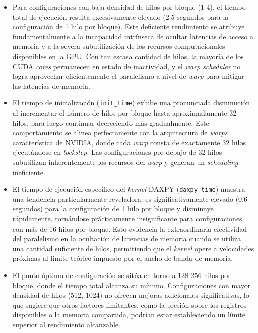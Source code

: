         \begin{itemize}
        
            \item Para configuraciones con baja densidad de hilos por bloque (1-4), el tiempo total de ejecución resulta excesivamente elevado (2.5 segundos para la configuración de 1 hilo por bloque). Este deficiente rendimiento se atribuye fundamentalmente a la incapacidad intrínseca de ocultar latencias de acceso a memoria y a la severa subutilización de los recursos computacionales disponibles en la GPU. Con tan escasa cantidad de hilos, la mayoría de los CUDA \textit{cores} permanecen en estado de inactividad, y el \textit{warp scheduler }no logra aprovechar eficientemente el paralelismo a nivel de \textit{warp} para mitigar las latencias de memoria.
            
            \item El tiempo de inicialización (\texttt{init\_time}) exhibe una pronunciada disminución al incrementar el número de hilos por bloque hasta aproximadamente 32 hilos, para luego continuar decreciendo más gradualmente. Este comportamiento se alinea perfectamente con la arquitectura de \textit{warps} característica de NVIDIA, donde cada \textit{warp} consta de exactamente 32 hilos ejecutándose en \textit{lockstep}. Las configuraciones por debajo de 32 hilos subutilizan inherentemente los recursos del \textit{warp} y generan un \textit{scheduling} ineficiente.
            
            \item El tiempo de ejecución específico del \textit{kernel} DAXPY (\texttt{daxpy\_time}) muestra una tendencia particularmente reveladora: es significativamente elevado (0.6 segundos) para la configuración de 1 hilo por bloque y disminuye rápidamente, tornándose prácticamente insignificante para configuraciones con más de 16 hilos por bloque. Esto evidencia la extraordinaria efectividad del paralelismo en la ocultación de latencias de memoria cuando se utiliza una cantidad suficiente de hilos, permitiendo que el \textit{kernel} opere a velocidades próximas al límite teórico impuesto por el ancho de banda de memoria.
            
            \item El punto óptimo de configuración se sitúa en torno a 128-256 hilos por bloque, donde el tiempo total alcanza su mínimo. Configuraciones con mayor densidad de hilos (512, 1024) no ofrecen mejoras adicionales significativas, lo que sugiere que otros factores limitantes, como la presión sobre los registros disponibles o la memoria compartida, podrían estar estableciendo un límite superior al rendimiento alcanzable.
        
        \end{itemize}
               
